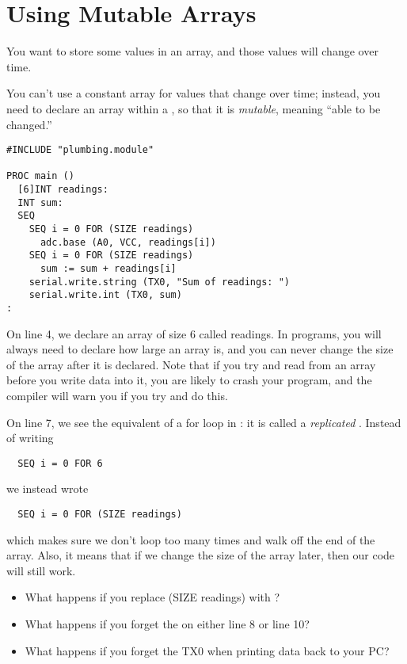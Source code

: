 \section{Using Mutable Arrays}
\problem
You want to store some values in an array, and those values will change over time.

\solution
You can't use a constant array for values that change over time; instead, you need to declare an array within a \PROC, so that it is \emph{mutable}, meaning ``able to be changed.''

\begin{lstlisting}
#INCLUDE "plumbing.module"

PROC main ()
  [6]INT readings:
  INT sum:
  SEQ
    SEQ i = 0 FOR (SIZE readings)
      adc.base (A0, VCC, readings[i])
    SEQ i = 0 FOR (SIZE readings)
      sum := sum + readings[i]
    serial.write.string (TX0, "Sum of readings: ")
    serial.write.int (TX0, sum)
:
\end{lstlisting}

\discussion
On line 4, we declare an array of size 6 called {\code readings}. In \occam programs, you will always need to declare how large an array is, and you can never change the size of the array after it is declared. Note that if you try and read from an array before you write data into it, you are likely to crash your \occam program, and the compiler will warn you if you try and do this.

On line 7, we see the equivalent of a {\code for} loop in \occam: it is called a \emph{replicated \SEQ}. Instead of writing 

\begin{lstlisting}
  SEQ i = 0 FOR 6
\end{lstlisting}

we instead wrote 

\begin{lstlisting}
  SEQ i = 0 FOR (SIZE readings)
\end{lstlisting}

which makes sure we don't loop too many times and walk off the end of the array. Also, it means that if we change the size of the array later, then our code will still work.

\makingthingsbreak
\begin{itemize}
	\item What happens if you replace {\code (SIZE readings}) with {}?
	\item What happens if you forget the {\code [i]} on either line 8 or line 10?
	\item What happens if you forget the {\code TX0} when printing data back to your PC?
\end{itemize}

\seealso

\XXX